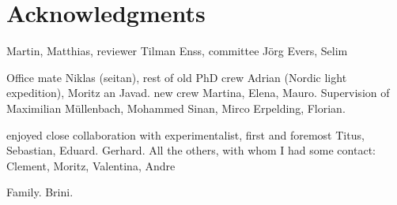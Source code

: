 
\bigskip

\begingroup
\let\clearpage\relax
\let\cleardoublepage\relax
\let\cleardoublepage\relax
\chapter*{Acknowledgments}
Martin, Matthias, reviewer Tilman Enss, committee Jörg Evers, Selim

Office mate Niklas (seitan), rest of old PhD crew Adrian (Nordic light expedition), Moritz an Javad. new crew Martina, Elena, Mauro. Supervision of Maximilian Müllenbach, Mohammed Sinan, Mirco Erpelding, Florian.

enjoyed close collaboration with experimentalist, first and foremost Titus, Sebastian, Eduard. Gerhard. All the others, with whom I had some contact: Clement, Moritz, Valentina, Andre

Family. Brini.
\endgroup
